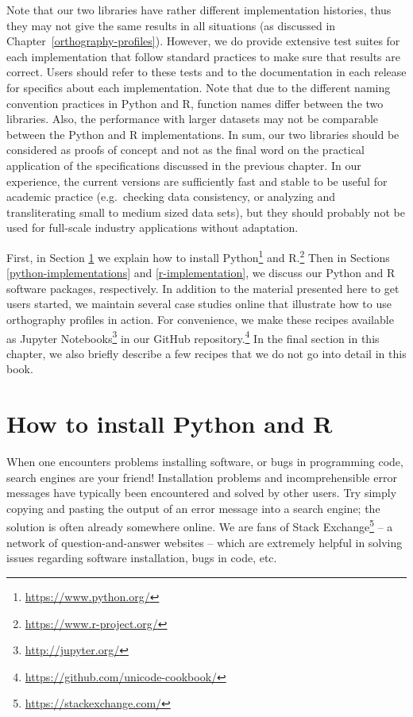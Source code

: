 \documentclass[output=inprep,
		biblatex
		]{LSP/langsci}\usepackage[]{graphicx}\usepackage[]{color}
\begin{document}
Note that our two libraries have rather different implementation histories, thus they may not give the same results in all situations (as discussed in Chapter~\ref{orthography-profiles}). However, we do provide extensive test suites for each implementation that follow standard practices to make sure that results are correct. Users should refer to these tests and to the documentation in each release for specifics about each implementation. Note that due to the different naming convention practices in Python and R, function names differ between the two libraries. Also, the performance with larger datasets may not be comparable between the Python and R implementations. In sum, our two libraries should be considered as proofs of concept and not as the final word on the practical application of the specifications discussed in the previous chapter. In our experience, the current versions are sufficiently fast and stable to be useful for academic practice (e.g.\ checking data consistency, or analyzing and transliterating small to medium sized data sets), but they should probably not be used for full-scale industry applications without adaptation.

First, in Section \ref{installing-python-and-r} we explain how to install Python\footnote{\url{https://www.python.org/}} and R.\footnote{\url{https://www.r-project.org/}} Then in Sections \ref{python-implementations} and \ref{r-implementation}, we discuss our Python and R software packages, respectively. In addition to the material presented here to get users started, we maintain several case studies online that illustrate how to use orthography profiles in action. For convenience, we make these recipes available as Jupyter Notebooks\footnote{\url{http://jupyter.org/}} in our GitHub repository.\footnote{\url{https://github.com/unicode-cookbook/}} In the final section in this chapter, we also briefly describe a few recipes that we do not go into detail in this book.

\section{How to install Python and R}
\label{installing-python-and-r}
When one encounters problems installing software, or bugs in programming code, search engines are your friend! Installation problems and incomprehensible error messages have typically been encountered and solved by other users. Try simply copying and pasting the output of an error message into a search engine; the solution is often already somewhere online. We are fans of Stack Exchange\footnote{\url{https://stackexchange.com/}} -- a network of question-and-answer websites -- which are extremely helpful in solving issues regarding software installation, bugs in code, etc.
\end{document}
